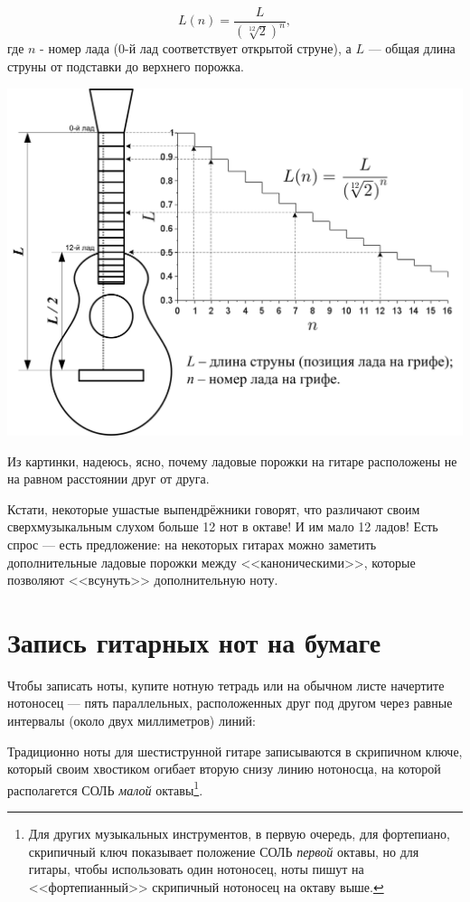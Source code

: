 \[L(n)=\frac{L}{(\sqrt[12]{2})^n},\]
где $n$ - номер лада ($0$-й лад соответствует открытой струне), а $L$ --- общая длина струны от подставки до верхнего порожка.


\includegraphics{fig/string-length.png}


Из картинки, надеюсь, ясно, почему ладовые порожки на гитаре расположены не на равном расстоянии друг от друга.

Кстати, некоторые ушастые выпендрёжники говорят, что различают своим сверхмузыкальным слухом больше 12 нот в октаве! И им мало 12 ладов! Есть спрос --- есть предложение: на некоторых гитарах можно заметить дополнительные ладовые порожки между <<каноническими>>, которые позволяют <<всунуть>> дополнительную ноту.


\section{Запись гитарных нот на бумаге}

Чтобы записать ноты, купите нотную тетрадь или на обычном листе начертите нотоносец --- пять параллельных, расположенных друг под другом через равные интервалы (около двух миллиметров) линий:
 

Традиционно ноты для шестиструнной гитаре записываются в скрипичном ключе, который своим хвостиком огибает вторую снизу линию нотоносца, на которой располагется СОЛЬ \emph{малой} октавы\footnote{Для других музыкальных инструментов, в первую очередь, для фортепиано, скрипичный ключ показывает положение СОЛЬ \emph{первой} октавы, но для гитары, чтобы использовать один нотоносец, ноты пишут на <<фортепианный>> скрипичный нотоносец на октаву выше.}.


